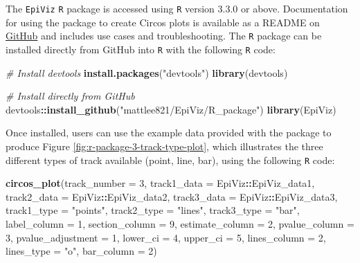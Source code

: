 \documentclass[11pt,twoside]{bristolthesis}
\newenvironment{Shaded}{\begin{snugshade}}{\end{snugshade}}
\newcommand{\CommentTok}[1]{\textcolor[rgb]{0.56,0.35,0.01}{\textit{#1}}}
\newcommand{\DataTypeTok}[1]{\textcolor[rgb]{0.13,0.29,0.53}{#1}}
\newcommand{\DecValTok}[1]{\textcolor[rgb]{0.00,0.00,0.81}{#1}}
\newcommand{\KeywordTok}[1]{\textcolor[rgb]{0.13,0.29,0.53}{\textbf{#1}}}
\newcommand{\NormalTok}[1]{#1}
\newcommand{\OperatorTok}[1]{\textcolor[rgb]{0.81,0.36,0.00}{\textbf{#1}}}
\newcommand{\StringTok}[1]{\textcolor[rgb]{0.31,0.60,0.02}{#1}}
\begin{document}
The \texttt{EpiViz} \texttt{R} package is accessed using \texttt{R} version 3.3.0 or above. Documentation for using the package to create Circos plots is available as a README on \href{https://github.com/mattlee821/EpiViz/tree/master/R_package}{GitHub} and includes use cases and troubleshooting. The \texttt{R} package can be installed directly from GitHub into \texttt{R} with the following \texttt{R} code:
\begin{Shaded}
\begin{Highlighting}[]
\CommentTok{# Install devtools}
\KeywordTok{install.packages}\NormalTok{(}\StringTok{"devtools"}\NormalTok{)}
\KeywordTok{library}\NormalTok{(devtools)}

\CommentTok{# Install directly from GitHub}
\NormalTok{devtools}\OperatorTok{::}\KeywordTok{install_github}\NormalTok{(}\StringTok{"mattlee821/EpiViz/R_package"}\NormalTok{)}
\KeywordTok{library}\NormalTok{(EpiViz)}
\end{Highlighting}
\end{Shaded}
Once installed, users can use the example data provided with the package to produce Figure \ref{fig:r-package-3-track-type-plot}, which illustrates the three different types of track available (point, line, bar), using the following \texttt{R} code:
\begin{Shaded}
\begin{Highlighting}[]
\KeywordTok{circos_plot}\NormalTok{(}\DataTypeTok{track_number =} \DecValTok{3}\NormalTok{,}
            \DataTypeTok{track1_data =}\NormalTok{ EpiViz}\OperatorTok{::}\NormalTok{EpiViz_data1,}
            \DataTypeTok{track2_data =}\NormalTok{ EpiViz}\OperatorTok{::}\NormalTok{EpiViz_data2,}
            \DataTypeTok{track3_data =}\NormalTok{ EpiViz}\OperatorTok{::}\NormalTok{EpiViz_data3,}
            \DataTypeTok{track1_type =} \StringTok{"points"}\NormalTok{,}
            \DataTypeTok{track2_type =} \StringTok{"lines"}\NormalTok{,}
            \DataTypeTok{track3_type =} \StringTok{"bar"}\NormalTok{,}
            \DataTypeTok{label_column =} \DecValTok{1}\NormalTok{,}
            \DataTypeTok{section_column =} \DecValTok{9}\NormalTok{,}
            \DataTypeTok{estimate_column =} \DecValTok{2}\NormalTok{,}
            \DataTypeTok{pvalue_column =} \DecValTok{3}\NormalTok{,}
            \DataTypeTok{pvalue_adjustment =} \DecValTok{1}\NormalTok{,}
            \DataTypeTok{lower_ci =} \DecValTok{4}\NormalTok{,}
            \DataTypeTok{upper_ci =} \DecValTok{5}\NormalTok{,}
            \DataTypeTok{lines_column =} \DecValTok{2}\NormalTok{,}
            \DataTypeTok{lines_type =} \StringTok{"o"}\NormalTok{,}
            \DataTypeTok{bar_column =} \DecValTok{2}\NormalTok{)}
\end{Highlighting}
\end{Shaded}
\end{document}
